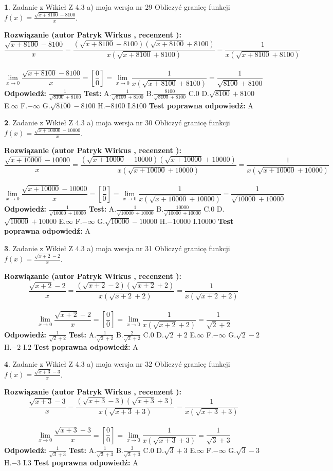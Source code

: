 \documentclass[12pt, a4paper]{article}
\theoremstyle{definition} %
\newtheorem{zad}{}
\newcommand{\zadStart}[1]{\begin{zad}#1\newline}
\newcommand{\zadStop}{\end{zad}}
\newcommand{\rozwStart}[2]{\noindent \textbf{Rozwiązanie (autor #1 , recenzent #2): }\newline}
\newcommand{\rozwStop}{\newline}
\newcommand{\odpStart}{\noindent \textbf{Odpowiedź:}\newline}
\newcommand{\odpStop}{\newline}
\newcommand{\testStart}{\noindent \textbf{Test:}\newline}
\newcommand{\testStop}{\newline}
\newcommand{\kluczStart}{\noindent \textbf{Test poprawna odpowiedź:}\newline}
\newcommand{\kluczStop}{\newline}
\begin{document}
\zadStart{Zadanie z Wikieł Z 4.3 a) moja wersja nr 29}
Obliczyć granicę funkcji $f(x)=\frac{\sqrt{x+8100}-8100}{x}$.
\zadStop
\rozwStart{Patryk Wirkus}{}
$$\frac{\sqrt{x+8100}-8100}{x}=\frac{(\sqrt{x+8100}-8100)(\sqrt{x+8100}+8100)}{x(\sqrt{x+8100}+8100)}=\frac{1}{x(\sqrt{x+8100}+8100)}$$
\\
$$\lim\limits_{x\to0}\frac{\sqrt{x+8100}-8100}{x}=[\frac{0}{0}]=
\lim\limits_{x\to0}\frac{1}{x(\sqrt{x+8100}+8100)} = \frac{1}{\sqrt{8100}+8100}$$
\rozwStop
\odpStart
$\frac{1}{\sqrt{8100}+8100}$
\odpStop
\testStart
A.$\frac{1}{\sqrt{8100}+8100}$
B.$\frac{8100}{\sqrt{8100}+8100}$
C.$0$
D.$\sqrt{8100}+8100$
E.$\infty$
F.$-\infty$
G.$\sqrt{8100}-8100$
H.$-8100$
I.$8100$
\testStop
\kluczStart
A
\kluczStop



\zadStart{Zadanie z Wikieł Z 4.3 a) moja wersja nr 30}
Obliczyć granicę funkcji $f(x)=\frac{\sqrt{x+10000}-10000}{x}$.
\zadStop
\rozwStart{Patryk Wirkus}{}
$$\frac{\sqrt{x+10000}-10000}{x}=\frac{(\sqrt{x+10000}-10000)(\sqrt{x+10000}+10000)}{x(\sqrt{x+10000}+10000)}=\frac{1}{x(\sqrt{x+10000}+10000)}$$
\\
$$\lim\limits_{x\to0}\frac{\sqrt{x+10000}-10000}{x}=[\frac{0}{0}]=
\lim\limits_{x\to0}\frac{1}{x(\sqrt{x+10000}+10000)} = \frac{1}{\sqrt{10000}+10000}$$
\rozwStop
\odpStart
$\frac{1}{\sqrt{10000}+10000}$
\odpStop
\testStart
A.$\frac{1}{\sqrt{10000}+10000}$
B.$\frac{10000}{\sqrt{10000}+10000}$
C.$0$
D.$\sqrt{10000}+10000$
E.$\infty$
F.$-\infty$
G.$\sqrt{10000}-10000$
H.$-10000$
I.$10000$
\testStop
\kluczStart
A
\kluczStop



\zadStart{Zadanie z Wikieł Z 4.3 a) moja wersja nr 31}
Obliczyć granicę funkcji $f(x)=\frac{\sqrt{x+2}-2}{x}$.
\zadStop
\rozwStart{Patryk Wirkus}{}
$$\frac{\sqrt{x+2}-2}{x}=\frac{(\sqrt{x+2}-2)(\sqrt{x+2}+2)}{x(\sqrt{x+2}+2)}=\frac{1}{x(\sqrt{x+2}+2)}$$
\\
$$\lim\limits_{x\to0}\frac{\sqrt{x+2}-2}{x}=[\frac{0}{0}]=
\lim\limits_{x\to0}\frac{1}{x(\sqrt{x+2}+2)} = \frac{1}{\sqrt{2}+2}$$
\rozwStop
\odpStart
$\frac{1}{\sqrt{2}+2}$
\odpStop
\testStart
A.$\frac{1}{\sqrt{2}+2}$
B.$\frac{2}{\sqrt{2}+2}$
C.$0$
D.$\sqrt{2}+2$
E.$\infty$
F.$-\infty$
G.$\sqrt{2}-2$
H.$-2$
I.$2$
\testStop
\kluczStart
A
\kluczStop



\zadStart{Zadanie z Wikieł Z 4.3 a) moja wersja nr 32}
Obliczyć granicę funkcji $f(x)=\frac{\sqrt{x+3}-3}{x}$.
\zadStop
\rozwStart{Patryk Wirkus}{}
$$\frac{\sqrt{x+3}-3}{x}=\frac{(\sqrt{x+3}-3)(\sqrt{x+3}+3)}{x(\sqrt{x+3}+3)}=\frac{1}{x(\sqrt{x+3}+3)}$$
\\
$$\lim\limits_{x\to0}\frac{\sqrt{x+3}-3}{x}=[\frac{0}{0}]=
\lim\limits_{x\to0}\frac{1}{x(\sqrt{x+3}+3)} = \frac{1}{\sqrt{3}+3}$$
\rozwStop
\odpStart
$\frac{1}{\sqrt{3}+3}$
\odpStop
\testStart
A.$\frac{1}{\sqrt{3}+3}$
B.$\frac{3}{\sqrt{3}+3}$
C.$0$
D.$\sqrt{3}+3$
E.$\infty$
F.$-\infty$
G.$\sqrt{3}-3$
H.$-3$
I.$3$
\testStop
\kluczStart
A
\kluczStop
\end{document}
